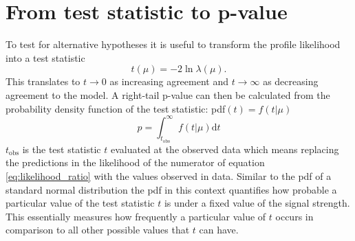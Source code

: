\section{From test statistic to p-value}
To test for alternative hypotheses it is useful to transform the profile likelihood into a test statistic
\begin{equation}
    t(\mu)=-2\ln \lambda(\mu).
\end{equation}
This translates to $t \rightarrow 0$ as increasing agreement and $t \rightarrow \infty$ as decreasing agreement to the model. A right-tail p-value can then be calculated from the probability density function of the test statistic: \ac{pdf}$(t) = f(t | \mu)$
\begin{equation}\label{eq:p-value}
    p= \int_{t_\text{obs}}^{\infty} 
    f(t | \mu) \mathrm{d}t
\end{equation}
$t_\text{obs}$ is the test statistic $t$ evaluated at the observed data which means replacing the predictions in the likelihood of the numerator of equation \ref{eq:likelihood_ratio} with the values observed in data. Similar to the \ac{pdf} of a standard normal distribution the \ac{pdf} in this context quantifies how probable a particular value of the test statistic $t$ is under a fixed value of the signal strength. This essentially measures how frequently a particular value of $t$ occurs in comparison to all other possible values that $t$ can have.

